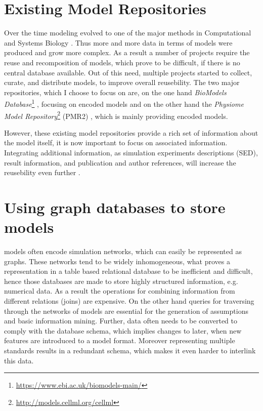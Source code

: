 \section{Existing Model Repositories}
\label{sec:background:modelrepo}
Over the time modeling evolved to one of the major methods in Computational and Systems Biology \citep{Finkelstein2004}. Thus more and more data in terms of models were produced and grow more complex. \citep{Henkel2010} As a result a number of projects require the reuse and recomposition of models, which prove to be difficult, if there is no central database available. \citep{Waltemath2013}
Out of this need, multiple projects started to collect, curate, and distribute models, to improve overall reusebility.
The two major repositories, which I choose to focus on are, on the one hand \emph{BioModels Database}\footnote{\url{https://www.ebi.ac.uk/biomodels-main/}} \citep{Li2010}, focusing on \sbml encoded models and on the other hand the \emph{Physiome Model Repository}\footnote{\url{http://models.cellml.org/cellml}} (PMR2) \citep{Yu2011}, which is mainly providing \cellml encoded models.

However, these existing model repositories provide a rich set of information about the model itself, it is now important to focus on associated information. Integrating additional information, as simulation experiments descriptions (SED), result information, and publication and author references, will increase the reusebility even further \citep{Waltemath2013,Henkel2012}.

\section{Using graph databases to store \sysbio models}
\label{sec:backgroung:graph-db}
\sysbio models often encode simulation networks, which can easily be represented as graphs. These networks tend to be widely inhomogeneous, what proves a representation in a table based relational database to be inefficient and difficult, hence those databases are made to store highly structured information, e.g. numerical data. As a result the operations for combining information from different relations (joins) are expensive. On the other hand queries for traversing through the networks of models are essential for the generation of assumptions and basic information mining. Further, data often needs to be converted to comply with the database schema, which implies changes to later, when new features are introduced to a model format. Moreover representing multiple standards results in a redundant schema, which makes it even harder to interlink this data. \citep{Lysenko2016}

